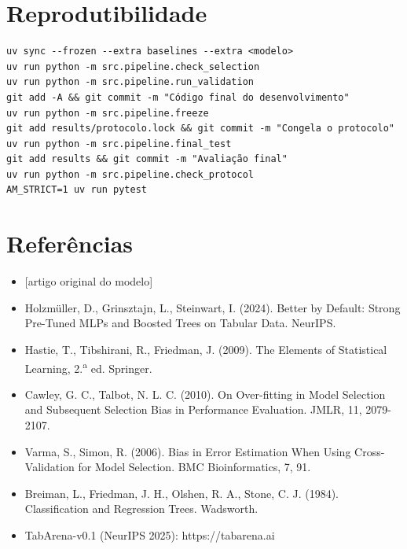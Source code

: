 \documentclass[11pt,a4paper]{article}
\begin{document}
\section{Reprodutibilidade}


\begin{verbatim}
uv sync --frozen --extra baselines --extra <modelo>
uv run python -m src.pipeline.check_selection
uv run python -m src.pipeline.run_validation
git add -A && git commit -m "Código final do desenvolvimento"
uv run python -m src.pipeline.freeze
git add results/protocolo.lock && git commit -m "Congela o protocolo"
uv run python -m src.pipeline.final_test
git add results && git commit -m "Avaliação final"
uv run python -m src.pipeline.check_protocol
AM_STRICT=1 uv run pytest
\end{verbatim}

\section*{Referências}

\begin{itemize}[leftmargin=1.2em]
\item {[artigo original do modelo]}
\item Holzmüller, D., Grinsztajn, L., Steinwart, I. (2024). Better by Default: Strong Pre-Tuned MLPs and Boosted Trees on Tabular Data. NeurIPS.
\item Hastie, T., Tibshirani, R., Friedman, J. (2009). The Elements of Statistical Learning, 2.\textsuperscript{a} ed. Springer.
\item Cawley, G. C., Talbot, N. L. C. (2010). On Over-fitting in Model Selection and Subsequent Selection Bias in Performance Evaluation. JMLR, 11, 2079-2107.
\item Varma, S., Simon, R. (2006). Bias in Error Estimation When Using Cross-Validation for Model Selection. BMC Bioinformatics, 7, 91.
\item Breiman, L., Friedman, J. H., Olshen, R. A., Stone, C. J. (1984). Classification and Regression Trees. Wadsworth.
\item TabArena-v0.1 (NeurIPS 2025): https://tabarena.ai
\end{itemize}
\end{document}
